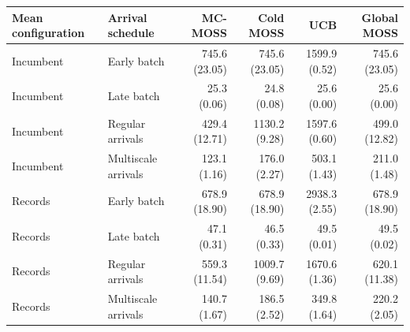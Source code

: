 \begin{tabular}{llrrrr}
\toprule
Mean configuration & Arrival schedule & MC-MOSS & Cold MOSS & UCB & Global MOSS \\
\midrule
Incumbent & Early batch & 745.6 (23.05) & 745.6 (23.05) & 1599.9 (0.52) & 745.6 (23.05) \\
Incumbent & Late batch & 25.3 (0.06) & 24.8 (0.08) & 25.6 (0.00) & 25.6 (0.00) \\
Incumbent & Regular arrivals & 429.4 (12.71) & 1130.2 (9.28) & 1597.6 (0.60) & 499.0 (12.82) \\
Incumbent & Multiscale arrivals & 123.1 (1.16) & 176.0 (2.27) & 503.1 (1.43) & 211.0 (1.48) \\
\addlinespace
Records & Early batch & 678.9 (18.90) & 678.9 (18.90) & 2938.3 (2.55) & 678.9 (18.90) \\
Records & Late batch & 47.1 (0.31) & 46.5 (0.33) & 49.5 (0.01) & 49.5 (0.02) \\
Records & Regular arrivals & 559.3 (11.54) & 1009.7 (9.69) & 1670.6 (1.36) & 620.1 (11.38) \\
Records & Multiscale arrivals & 140.7 (1.67) & 186.5 (2.52) & 349.8 (1.64) & 220.2 (2.05) \\
\bottomrule
\end{tabular}
